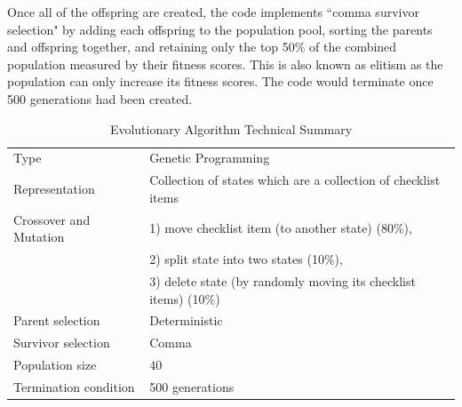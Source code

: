 \documentclass[3p,times,procedia]{elsarticle}
\begin{document}
Once all of the offspring are created, the code implements ``comma survivor selection" by adding each offspring to the population pool, sorting the parents and offspring together, and retaining only the top 50\% of the combined population measured by their fitness scores. This is also known as elitism as the population can only increase its fitness scores. The code would terminate once 500 generations had been created.


\begin{table}[h]
\caption{Evolutionary Algorithm Technical Summary}
\label{TechnicalSummary}
\centering
\begin{tabular}{p{1.70in}p{4.30in}}
\hline
{Type}  & {Genetic Programming} \\ 
{Representation} & {Collection of states which are a collection of checklist items}  \\ 
{Crossover and Mutation} & {1) move checklist item (to another state) (80\%), } \\
{} & {2) split state into two states (10\%), } \\ 
{} & {3) delete state (by randomly moving its checklist items) (10\%) } \\ 
{Parent selection} & {Deterministic} \\ 
{Survivor selection}  & {Comma} \\ 
{Population size}  & {40} \\ 
{Termination \mbox{condition}} & {500 generations} \\ 
\hline
\end{tabular}
\end{table}
\end{document}
